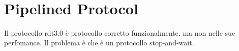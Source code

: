 \documentclass{book}
\begin{document}
\

\

\

\

\

\

\

\

\

\

\

\

\

\

\

\

\

\

\

\

\

\

\

\

\

\

\

\

\

\

\

\section{Pipelined Protocol}

Il protocollo rdt3.0 {\`e} protocollo corretto funzionalmente, ma non nelle
sue perfomance. Il problema {\`e} che {\`e} un protocollo stop-and-wait.
\end{document}
